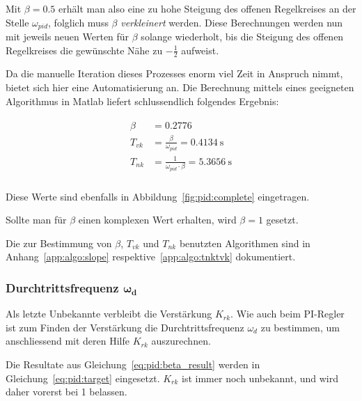 Mit  $\beta  = 0.5$  erh\"alt  man  also eine  zu  hohe  Steigung des  offenen
Regelkreises   an    der   Stelle  $\omega_{pid}$,   folglich   muss   $\beta$
\emph{verkleinert} werden.   Diese Berechnungen  werden nun mit  jeweils neuen
Werten  f\"ur  $\beta$  solange  wiederholt,  bis  die  Steigung  des  offenen
Regelkreises die gew\"unschte N\"ahe zu $-\frac{1}{2}$ aufweist.

Da die manuelle Iteration dieses Prozesses  enorm viel Zeit in Anspruch nimmt,
bietet  sich  hier  eine  Automatisierung  an. Die  Berechnung  mittels  eines
geeigneten Algorithmus in Matlab liefert schlussendlich folgendes Ergebnis:

\begin{gather} \label{eq:pid:beta_result}
    \begin{split}
        \beta    & = 0.2776 \\
        {T_{vk}} & = \frac{\beta}{\omega_{pid}}           = \SI{0.4134}{\second} \\
        {T_{nk}} & = \frac{1}{\omega_{pid} \cdot \beta}   = \SI{5.3656}{\second} \\
    \end{split}
\end{gather}

Diese Werte sind ebenfalls in Abbildung~\ref{fig:pid:complete} eingetragen.

Sollte  man  f\"ur  $\beta$  einen komplexen  Wert  erhalten,  wird  $\beta=1$
gesetzt.

Die zur  Bestimmung von $\beta$,  $T_{vk}$ und $T_{nk}$  benutzten Algorithmen
sind    in     Anhang~\ref{app:algo:slope}    respektive~\ref{app:algo:tnktvk}
dokumentiert.


\subsubsection{Durchtrittsfrequenz $\mathbf{\boldsymbol{\omega}_d}$}

Als  letzte Unbekannte  verbleibt  die Verst\"arkung  $K_{rk}$. Wie auch  beim
PI-Regler ist zum Finden  der Verst\"arkung die Durchtrittsfrequenz $\omega_d$
zu bestimmen, um anschliessend mit deren Hilfe $K_{rk}$ auszurechnen.

Die    Resultate    aus     Gleichung~\ref{eq:pid:beta_result}    werden    in
Gleichung~\ref{eq:pid:target} eingesetzt. $K_{rk}$  ist immer  noch unbekannt,
und wird daher vorerst bei 1 belassen.

